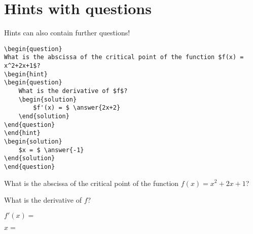 \documentclass{ximera}
\begin{document}
\section{Hints with questions}

Hints can also contain further questions! 

\begin{verbatim}
\begin{question}
What is the abscissa of the critical point of the function $f(x) = x^2+2x+1$?
\begin{hint}
\begin{question}
	What is the derivative of $f$?
	\begin{solution}
		$f'(x) = $ \answer{2x+2}
	\end{solution}
\end{question}
\end{hint}
\begin{solution}
	$x = $ \answer{-1}
\end{solution}
\end{question}
\end{verbatim}

\begin{question}
What is the abscissa of the critical point of the function $f(x) = x^2+2x+1$?
\begin{hint}
\begin{question}
	What is the derivative of $f$?
	\begin{solution}
		$f'(x) = $ 
	\end{solution}
\end{question}
\end{hint}
\begin{solution}
	$x = $ \answer{-1}
\end{solution}
\end{question}
\end{document}
